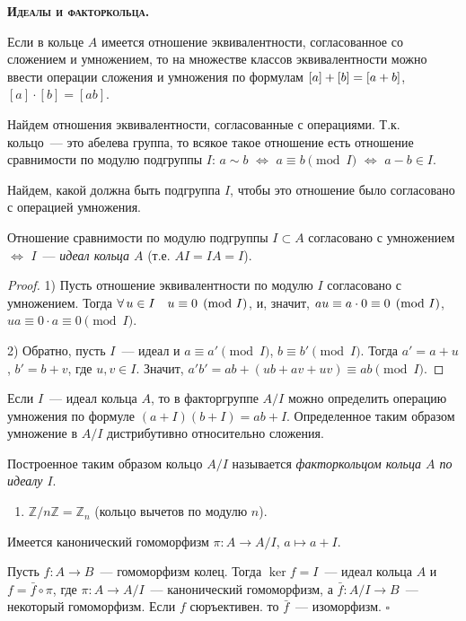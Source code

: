 \documentclass[a4paper]{article}
\newcommand*{\tema}[1]{\vspace{20pt}
\begin{center}{\textbf{\textsc{#1.}}}\vspace{5pt}
\end{center}}
\newcommand*{\p}[1]{#1\nobreak\discretionary{}{\hbox{$\mathsurround=0pt #1$}}{}}
\begin{document}
\tema{Идеалы и факторкольца}

Если в кольце $A$ имеется отношение эквивалентности, согласованное
со сложением и умножением, то на множестве классов эквивалентности
можно ввести операции сложения и умножения по формулам
$[a]+[b]\p=[a+b]$, $[a]\cdot[b]=[ab]$.

Найдем отношения эквивалентности, согласованные с операциями. Т.к.
кольцо~--- это абелева группа, то всякое такое отношение есть
отношение сравнимости по модулю подгруппы $I$: $a\sim b$
$\Leftrightarrow$ $a\equiv b\pmod{I}$ $\Leftrightarrow$ $a-b\in I$.

Найдем, какой должна быть подгруппа $I$, чтобы это отношение было
согласовано с операцией умножения.

\begin{theorem}
Отношение сравнимости по модулю подгруппы $I\subset A$ согласовано с
умножением $\Leftrightarrow$ $I$~--- \emph{идеал кольца $A$} (т.е.
$AI=IA=I$).
\end{theorem}

\begin{proof}
1) Пусть отношение эквивалентности по модулю $I$ согласовано с
умножением. Тогда $\forall \, u\in I\quad u\p\equiv 0\pmod{I}$, и,
значит, $au\p\equiv a\cdot 0\p\equiv0\pmod{I}$, $ua\equiv0\cdot
a\equiv0\pmod{I}$.

2) Обратно, пусть $I$~--- идеал и $a\equiv a'\pmod{I}$, $b\equiv
b'\pmod{I}$. Тогда $a'=a+u$, $b'=b+v$, где $u,v\in I$. Значит,
$a'b'=ab+(ub+av+uv)\equiv ab\pmod{I}$.
\end{proof}

Если $I$~--- идеал кольца $A$, то в факторгруппе $A/I$ можно
определить операцию умножения по формуле $(a+I)(b+I)=ab+I$.
Определенное таким образом умножение в $A/I$ дистрибутивно
относительно сложения.

Построенное таким образом кольцо $A/I$ называется
\emph{факторкольцом кольца $A$ по идеалу $I$}.

\begin{ex}
\begin{enumerate}
  \item $\mathbb{Z}/n\mathbb{Z}=\mathbb{Z}_n$ (кольцо вычетов по модулю
  $n$).
\end{enumerate}
\end{ex}

Имеется канонический гомоморфизм $\pi\colon A\to A/I$, $a\mapsto
a+I$.

\begin{theorem}
Пусть $f\colon A\to B$~--- гомоморфизм колец. Тогда $\ker f=I$~---
идеал кольца $A$ и $f=\bar{f}\circ \pi$, где $\pi\colon A\to
A/I$~--- канонический гомоморфизм, а $\bar{f}\colon A/I\to B$~---
некоторый гомоморфизм. Если $f$ сюръективен. то $\bar{f}$~---
изоморфизм. $\square$
\end{theorem}
\end{document}
